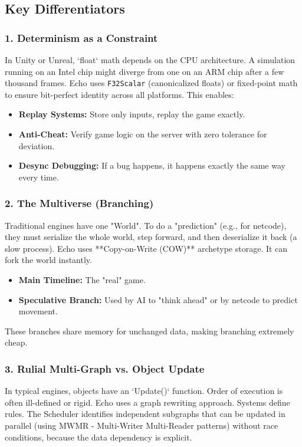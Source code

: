 \subsection{Key Differentiators}

\subsubsection{1. Determinism as a Constraint}
In Unity or Unreal, `float` math depends on the CPU architecture. A simulation running on an Intel chip might diverge from one on an ARM chip after a few thousand frames.
Echo uses \texttt{F32Scalar} (canonicalized floats) or fixed-point math to ensure bit-perfect identity across all platforms. This enables:
\begin{itemize}
    \item \textbf{Replay Systems:} Store only inputs, replay the game exactly.
    \item \textbf{Anti-Cheat:} Verify game logic on the server with zero tolerance for deviation.
    \item \textbf{Desync Debugging:} If a bug happens, it happens exactly the same way every time.
\end{itemize}

\subsubsection{2. The Multiverse (Branching)}
Traditional engines have one "World". To do a "prediction" (e.g., for netcode), they must serialize the whole world, step forward, and then deserialize it back (a slow process).
Echo uses **Copy-on-Write (COW)** archetype storage. It can fork the world instantly.
\begin{itemize}
    \item \textbf{Main Timeline:} The "real" game.
    \item \textbf{Speculative Branch:} Used by AI to "think ahead" or by netcode to predict movement.
\end{itemize}
These branches share memory for unchanged data, making branching extremely cheap.

\subsubsection{3. Rulial Multi-Graph vs. Object Update}
In typical engines, objects have an `Update()` function. Order of execution is often ill-defined or rigid.
Echo uses a graph rewriting approach. Systems define rules. The Scheduler identifies independent subgraphs that can be updated in parallel (using MWMR - Multi-Writer Multi-Reader patterns) without race conditions, because the data dependency is explicit.
